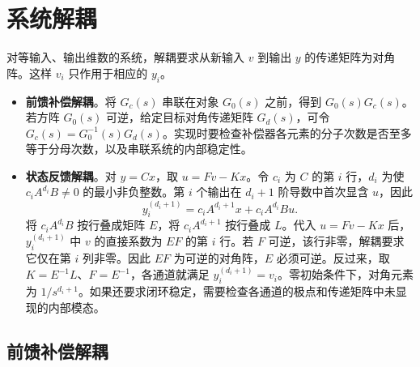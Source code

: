 \section{系统解耦}

对等输入、输出维数的系统，解耦要求从新输入 $v$ 到输出 $y$ 的传递矩阵为对角阵。这样 $v_i$ 只作用于相应的 $y_i$。
\begin{itemize}
    \item \textbf{前馈补偿解耦}。将 $G_c(s)$ 串联在对象 $G_0(s)$ 之前，得到 $G_0(s)G_c(s)$。若方阵 $G_0(s)$ 可逆，给定目标对角传递矩阵 $G_d(s)$，可令 $G_c(s)=G_0^{-1}(s)G_d(s)$。实现时要检查补偿器各元素的分子次数是否至多等于分母次数，以及串联系统的内部稳定性。
    \item \textbf{状态反馈解耦}。对 $y=Cx$，取 $u=Fv-Kx$。令 $c_i$ 为 $C$ 的第 $i$ 行，$d_i$ 为使 $c_iA^{d_i}B\ne 0$ 的最小非负整数。第 $i$ 个输出在 $d_i+1$ 阶导数中首次显含 $u$，因此
    \[
        y_i^{(d_i+1)}=c_iA^{d_i+1}x+c_iA^{d_i}Bu.
    \]
    将 $c_iA^{d_i}B$ 按行叠成矩阵 $E$，将 $c_iA^{d_i+1}$ 按行叠成 $L$。代入 $u=Fv-Kx$ 后，$y_i^{(d_i+1)}$ 中 $v$ 的直接系数为 $EF$ 的第 $i$ 行。若 $F$ 可逆，该行非零，解耦要求它仅在第 $i$ 列非零。因此 $EF$ 为可逆的对角阵，$E$ 必须可逆。反过来，取 $K=E^{-1}L$、$F=E^{-1}$，各通道就满足 $y_i^{(d_i+1)}=v_i$。零初始条件下，对角元素为 $1/s^{d_i+1}$。如果还要求闭环稳定，需要检查各通道的极点和传递矩阵中未显现的内部模态。
\end{itemize}

\subsection{前馈补偿解耦}


